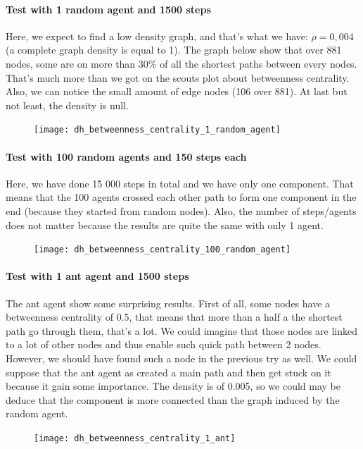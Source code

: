 \documentclass{article}
\begin{document}
		\paragraph{Test with 1 random agent and 1500 steps}
			Here, we expect to find a low density graph, and that's what we have: $\rho = 0,004$ (a complete graph density is equal to 1).
			The graph below show that over 881 nodes, some are on more than 30\% of all the shortest paths between every nodes.
			That's much more than we got on the scouts plot about betweenness centrality.
			Also, we can notice the small amount of edge nodes (106 over 881).
			At last but not least, the density is null.
		\begin{figure}[!h]\hspace{2cm}
			\texttt{[image: dh\_betweenness\_centrality\_1\_random\_agent]}
		\end{figure}
		\paragraph{Test with 100 random agents and 150 steps each}
			Here, we have done 15 000 steps in total and we have only one component.
			That means that the 100 agents crossed each other path to form one component in the end
			(because they started from random nodes).
			Also, the number of steps/agents does not matter because the results are quite the same with only 1 agent.
		\begin{figure}[!h]\hspace{2cm}
			\texttt{[image: dh\_betweenness\_centrality\_100\_random\_agent]}
		\end{figure}
		\paragraph{Test with 1 ant agent and 1500 steps}
			The ant agent show some surprising results.
			First of all, some nodes have a betweenness centrality of 0.5,
			that means that more than a half a the shortest path go through them, that's a lot.
			We could imagine that those nodes are linked to a lot of other nodes and thus enable such quick path between 2 nodes.
			However, we should have found such a node in the previous try as well.
			We could suppose that the ant agent as created a main path and then get stuck on it because it gain some importance.
			The density is of 0.005,
			so we could may be deduce that the component is more connected than the graph induced by the random agent.
		\begin{figure}[!h]\hspace{2cm}
			\texttt{[image: dh\_betweenness\_centrality\_1\_ant]}
		\end{figure}
\end{document}
